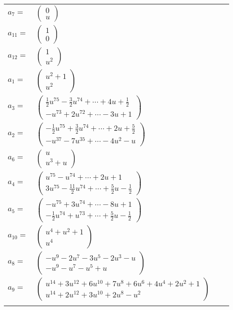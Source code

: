 \documentclass[1p]{elsarticle_modified}
\theoremstyle{definition}
\begin{document}
\begin{tabular}{m{7pt} m{180pt} m{7pt} m{180pt} }
\flushright $a_{7}=$&$\begin{pmatrix}0\\u\end{pmatrix}$ \\
\flushright $a_{11}=$&$\begin{pmatrix}1\\0\end{pmatrix}$ \\
\flushright $a_{12}=$&$\begin{pmatrix}1\\u^2\end{pmatrix}$ \\
\flushright $a_{1}=$&$\begin{pmatrix}u^2+1\\u^2\end{pmatrix}$ \\
\flushright $a_{3}=$&$\begin{pmatrix}\frac{1}{2} u^{75}-\frac{3}{2} u^{74}+\cdots+4 u+\frac{1}{2}\\- u^{73}+2 u^{72}+\cdots-3 u+1\end{pmatrix}$ \\
\flushright $a_{2}=$&$\begin{pmatrix}-\frac{1}{2} u^{75}+\frac{3}{2} u^{74}+\cdots+2 u+\frac{5}{2}\\- u^{37}-7 u^{35}+\cdots-4 u^2- u\end{pmatrix}$ \\
\flushright $a_{6}=$&$\begin{pmatrix}u\\u^3+u\end{pmatrix}$ \\
\flushright $a_{4}=$&$\begin{pmatrix}u^{75}- u^{74}+\cdots+2 u+1\\3 u^{75}-\frac{11}{2} u^{74}+\cdots+\frac{5}{2} u-\frac{1}{2}\end{pmatrix}$ \\
\flushright $a_{5}=$&$\begin{pmatrix}- u^{75}+3 u^{74}+\cdots-8 u+1\\-\frac{1}{2} u^{74}+u^{73}+\cdots+\frac{5}{2} u-\frac{1}{2}\end{pmatrix}$ \\
\flushright $a_{10}=$&$\begin{pmatrix}u^4+u^2+1\\u^4\end{pmatrix}$ \\
\flushright $a_{8}=$&$\begin{pmatrix}- u^9-2 u^7-3 u^5-2 u^3- u\\- u^9- u^7- u^5+u\end{pmatrix}$ \\
\flushright $a_{9}=$&$\begin{pmatrix}u^{14}+3 u^{12}+6 u^{10}+7 u^8+6 u^6+4 u^4+2 u^2+1\\u^{14}+2 u^{12}+3 u^{10}+2 u^8- u^2\end{pmatrix}$\\&\end{tabular}
\end{document}
